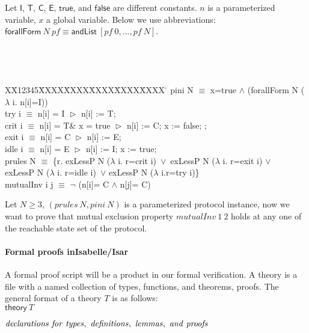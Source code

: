 \documentclass{llncs}
\newlength{\fminilength}
\newenvironment{fmini}[1][\linewidth]
  {\setlength{\fminilength}{#1\fboxsep-2\fboxrule}%
   \vspace{2ex}\noindent\begin{lrbox}{\fminibox}\begin{minipage}{\fminilength}%
   \mbox{ }\hfill\vspace{-2.5ex}}%
  {\end{minipage}\end{lrbox}\vspace{1ex}\hspace{0ex}%
   \framebox{\usebox{\fminibox}}}
\newenvironment{specification}
{\noindent\footnotesize
\tt\begin{fmini}\begin{tabbing}X\=X12345\=XXXX\=XXXX\=XXXX\=XXXX\=XXXX
\=\+\kill} {\end{tabbing}\normalfont\end{fmini}}
\begin{document}
Let $\mathsf{I}$, $\mathsf{T}$, $\mathsf{C}$,  $\mathsf{E}$,
$\mathsf{true}$, and $\mathsf{false}$ are different  constants. $n$
is a parameterized variable, $x$ a global variable. Below we use
abbreviations:
$\mathsf{forallForm}~N~pf\equiv\mathsf{andList}~[pf~0,...,pf~N]$.

\begin{specification}
 pini  N $\equiv$
   x=true $\wedge$ (forallForm N ($\lambda$ i. n[i]=I))\\

    try i $\equiv$ n[i] = I $\vartriangleright$ n[i] := T; \\

    crit i $\equiv$ n[i] = T\& x = true $\vartriangleright$  n[i] := C; x := false;  ;\\

%
   exit i $\equiv$ n[i] = C $\vartriangleright$ n[i] := E; \\


   idle  i $\equiv$  n[i] = E $\vartriangleright$ n[i] := I;  x := true;
  \\%
   prules N $\equiv$ \{r. exLessP N ($\lambda$ i. r=crit   i)~$\vee$~exLessP N ($\lambda$ i. r=exit
i)  $\vee$\\
 exLessP N ($\lambda$ i. r=idle i)~$\vee$ exLessP N ($\lambda$ i.r=try i)\}\\

mutualInv i j $\equiv$
  $\neg$ (n[i]= C $\wedge$ n[j]= C)\\



\end{specification}

Let $N \ge 3$, $(prules~N, pini~N)$ is a parameterized protocol
instance, now we want to prove that mutual exclusion property
$mutualInv~1~2$ holds at any one of the reachable state set of the
protocol.

\paragraph*{Formal proofs inIsabelle/Isar } A formal proof script
will be a product in our formal verification.  A theory is a file
with a named collection of types, functions, and theorems, proofs.
The general format of a theory $T$ is as
follows: \\

$\mathsf{theory}\ T$

${\it declarations\ for\ types,\ definitions,\ lemmas,\ and\
proofs}$
\end{document}
